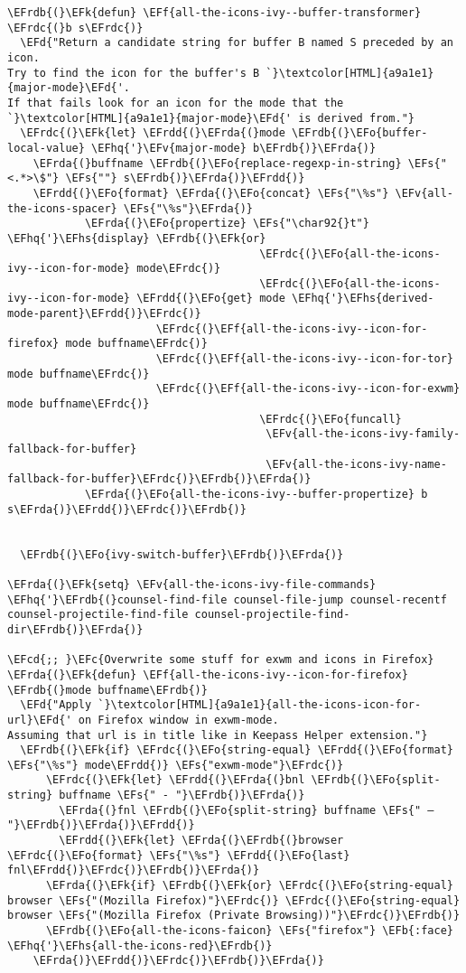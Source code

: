 \documentclass[a4wide,10pt]{article}
\newcommand{\EFc}[1]{\textcolor{EFc}{#1}} %
\newcommand{\EFcd}[1]{\textcolor{EFcd}{#1}} %
\newcommand{\EFs}[1]{\textcolor{EFs}{#1}} %
\newcommand{\EFd}[1]{\textcolor{EFd}{#1}} %
\newcommand{\EFk}[1]{\textcolor{EFk}{#1}} %
\newcommand{\EFb}[1]{\textcolor{EFb}{#1}} %
\newcommand{\EFf}[1]{\textcolor{EFf}{#1}} %
\newcommand{\EFv}[1]{\textcolor{EFv}{#1}} %
\newcommand{\EFo}[1]{\textcolor{EFo}{#1}} %
\newcommand{\EFhq}[1]{\textcolor{EFhq}{#1}} %
\newcommand{\EFhs}[1]{\textcolor{EFhs}{#1}} %
\newcommand{\EFrda}[1]{\textcolor{EFrda}{#1}} %
\newcommand{\EFrdb}[1]{\textcolor{EFrdb}{#1}} %
\newcommand{\EFrdc}[1]{\textcolor{EFrdc}{#1}} %
\newcommand{\EFrdd}[1]{\textcolor{EFrdd}{#1}} %
\begin{document}
\begin{Code}
\begin{Verbatim}
\EFrdb{(}\EFk{defun} \EFf{all-the-icons-ivy--buffer-transformer} \EFrdc{(}b s\EFrdc{)}
  \EFd{"Return a candidate string for buffer B named S preceded by an icon.
Try to find the icon for the buffer's B `}\textcolor[HTML]{a9a1e1}{major-mode}\EFd{'.
If that fails look for an icon for the mode that the `}\textcolor[HTML]{a9a1e1}{major-mode}\EFd{' is derived from."}
  \EFrdc{(}\EFk{let} \EFrdd{(}\EFrda{(}mode \EFrdb{(}\EFo{buffer-local-value} \EFhq{'}\EFv{major-mode} b\EFrdb{)}\EFrda{)}
	\EFrda{(}buffname \EFrdb{(}\EFo{replace-regexp-in-string} \EFs{"<.*>\$"} \EFs{""} s\EFrdb{)}\EFrda{)}\EFrdd{)}
    \EFrdd{(}\EFo{format} \EFrda{(}\EFo{concat} \EFs{"\%s"} \EFv{all-the-icons-spacer} \EFs{"\%s"}\EFrda{)}
            \EFrda{(}\EFo{propertize} \EFs{"\char92{}t"} \EFhq{'}\EFhs{display} \EFrdb{(}\EFk{or}
                                       \EFrdc{(}\EFo{all-the-icons-ivy--icon-for-mode} mode\EFrdc{)}
                                       \EFrdc{(}\EFo{all-the-icons-ivy--icon-for-mode} \EFrdd{(}\EFo{get} mode \EFhq{'}\EFhs{derived-mode-parent}\EFrdd{)}\EFrdc{)}
				       \EFrdc{(}\EFf{all-the-icons-ivy--icon-for-firefox} mode buffname\EFrdc{)}
				       \EFrdc{(}\EFf{all-the-icons-ivy--icon-for-tor} mode buffname\EFrdc{)}
				       \EFrdc{(}\EFf{all-the-icons-ivy--icon-for-exwm} mode buffname\EFrdc{)}
                                       \EFrdc{(}\EFo{funcall}
                                        \EFv{all-the-icons-ivy-family-fallback-for-buffer}
                                        \EFv{all-the-icons-ivy-name-fallback-for-buffer}\EFrdc{)}\EFrdb{)}\EFrda{)}
            \EFrda{(}\EFo{all-the-icons-ivy--buffer-propertize} b s\EFrda{)}\EFrdd{)}\EFrdc{)}\EFrdb{)}


  \EFrdb{(}\EFo{ivy-switch-buffer}\EFrdb{)}\EFrda{)}

\EFrda{(}\EFk{setq} \EFv{all-the-icons-ivy-file-commands} \EFhq{'}\EFrdb{(}counsel-find-file counsel-file-jump counsel-recentf counsel-projectile-find-file counsel-projectile-find-dir\EFrdb{)}\EFrda{)}

\EFcd{;; }\EFc{Overwrite some stuff for exwm and icons in Firefox}
\EFrda{(}\EFk{defun} \EFf{all-the-icons-ivy--icon-for-firefox} \EFrdb{(}mode buffname\EFrdb{)}
  \EFd{"Apply `}\textcolor[HTML]{a9a1e1}{all-the-icons-icon-for-url}\EFd{' on Firefox window in exwm-mode.
Assuming that url is in title like in Keepass Helper extension."}
  \EFrdb{(}\EFk{if} \EFrdc{(}\EFo{string-equal} \EFrdd{(}\EFo{format} \EFs{"\%s"} mode\EFrdd{)} \EFs{"exwm-mode"}\EFrdc{)}
      \EFrdc{(}\EFk{let} \EFrdd{(}\EFrda{(}bnl \EFrdb{(}\EFo{split-string} buffname \EFs{" - "}\EFrdb{)}\EFrda{)}
	    \EFrda{(}fnl \EFrdb{(}\EFo{split-string} buffname \EFs{" — "}\EFrdb{)}\EFrda{)}\EFrdd{)}
	    \EFrdd{(}\EFk{let} \EFrda{(}\EFrdb{(}browser \EFrdc{(}\EFo{format} \EFs{"\%s"} \EFrdd{(}\EFo{last} fnl\EFrdd{)}\EFrdc{)}\EFrdb{)}\EFrda{)}
      \EFrda{(}\EFk{if} \EFrdb{(}\EFk{or} \EFrdc{(}\EFo{string-equal} browser \EFs{"(Mozilla Firefox)"}\EFrdc{)} \EFrdc{(}\EFo{string-equal} browser \EFs{"(Mozilla Firefox (Private Browsing))"}\EFrdc{)}\EFrdb{)}
	  \EFrdb{(}\EFo{all-the-icons-faicon} \EFs{"firefox"} \EFb{:face} \EFhq{'}\EFhs{all-the-icons-red}\EFrdb{)}
	\EFrda{)}\EFrdd{)}\EFrdc{)}\EFrdb{)}\EFrda{)}


\end{Verbatim}
\end{Code}
\end{document}
